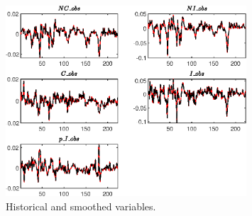  
\begin{figure}[H]
\centering 
\includegraphics[width=0.80\textwidth]{BRS_sectoral_rest/graphs/BRS_sectoral_rest_HistoricalAndSmoothedVariables1}
\caption{Historical and smoothed variables.}\label{Fig:HistoricalAndSmoothedVariables:1}
\end{figure}


